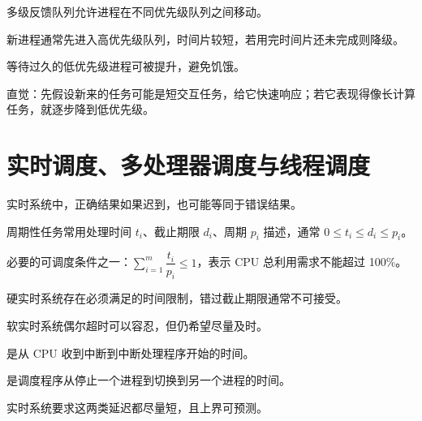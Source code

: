 \begin{points}
  \item 多级反馈队列允许进程在不同优先级队列之间移动。
  \item 新进程通常先进入高优先级队列，时间片较短，若用完时间片还未完成则降级。
  \item 等待过久的低优先级进程可被提升，避免饥饿。
  \item 直觉：先假设新来的任务可能是短交互任务，给它快速响应；若它表现得像长计算任务，就逐步降到低优先级。
\end{points}


\section{实时调度、多处理器调度与线程调度}
\begin{points}
  \item 实时系统中，正确结果如果迟到，也可能等同于错误结果。
  \item 周期性任务常用处理时间 $t_i$、截止期限 $d_i$、周期 $p_i$ 描述，通常 $0\le t_i\le d_i\le p_i$。
  \item 必要的可调度条件之一：$\sum_{i=1}^{m}\dfrac{t_i}{p_i}\le 1$，表示 CPU 总利用需求不能超过 100\%。
\end{points}


\begin{points}
  \item 硬实时系统存在必须满足的时间限制，错过截止期限通常不可接受。
  \item 软实时系统偶尔超时可以容忍，但仍希望尽量及时。
  \item {}是从 CPU 收到中断到中断处理程序开始的时间。
  \item {}是调度程序从停止一个进程到切换到另一个进程的时间。
  \item 实时系统要求这两类延迟都尽量短，且上界可预测。
\end{points}


